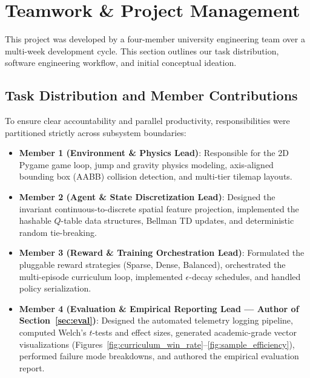 \section{Teamwork \& Project Management}
\label{sec:teamwork}

This project was developed by a four-member university engineering team over a multi-week development cycle. This section outlines our task distribution, software engineering workflow, and initial conceptual ideation.

\subsection{Task Distribution and Member Contributions}
To ensure clear accountability and parallel productivity, responsibilities were partitioned strictly across subsystem boundaries:

\begin{itemize}
    \item \textbf{Member 1 (Environment \& Physics Lead)}: Responsible for the 2D Pygame game loop, jump and gravity physics modeling, axis-aligned bounding box (AABB) collision detection, and multi-tier tilemap layouts.
    \item \textbf{Member 2 (Agent \& State Discretization Lead)}: Designed the invariant continuous-to-discrete spatial feature projection, implemented the hashable $Q$-table data structures, Bellman TD updates, and deterministic random tie-breaking.
    \item \textbf{Member 3 (Reward \& Training Orchestration Lead)}: Formulated the pluggable reward strategies (Sparse, Dense, Balanced), orchestrated the multi-episode curriculum loop, implemented $\epsilon$-decay schedules, and handled policy serialization.
    \item \textbf{Member 4 (Evaluation \& Empirical Reporting Lead --- Author of Section~\ref{sec:eval})}: Designed the automated telemetry logging pipeline, computed Welch's $t$-tests and effect sizes, generated academic-grade vector visualizations (Figures~\ref{fig:curriculum_win_rate}--\ref{fig:sample_efficiency}), performed failure mode breakdowns, and authored the empirical evaluation report.
\end{itemize}

